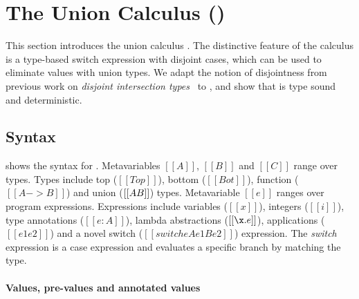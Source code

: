 \section{The Union Calculus (\name)}
\label{sec:union}

This section introduces the union calculus \name. The distinctive feature
of the \name calculus is a type-based switch expression with disjoint
cases, which can be used to eliminate values with union types.
We adapt the notion of disjointness from previous work on
\emph{disjoint intersection types}~\cite{oliveira2016disjoint} to \name, and show that \name is type
sound and deterministic.


\subsection{Syntax}\label{sec:union:syntax}
 shows the syntax for \cal. Metavariables
$[[A]]$, $[[B]]$ and $[[C]]$ range over types.  Types include top ($[[Top]]$),
bottom ($[[Bot]]$), function ($[[A -> B]]$) and union ($[[A \/ B]]$)
types. Metavariable $[[e]]$ ranges over program
expressions. Expressions include variables ($[[x]]$), integers
($[[i]]$), type annotations ($[[e:A]]$), lambda abstractions
($[[\x.e]]$), applications ($[[e1 e2]]$) and a novel switch ($[[switch
    e A e1 B e2]]$) expression. The \emph{switch} expression is a case
expression and evaluates a specific branch by matching the
type.


\paragraph{Values, pre-values and annotated values}

